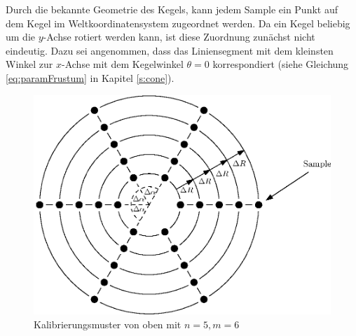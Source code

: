 Durch die bekannte Geometrie des Kegels, kann jedem Sample ein Punkt auf dem Kegel im Weltkoordinatensystem zugeordnet werden. Da ein Kegel beliebig um die $y$-Achse rotiert werden kann, ist diese Zuordnung zunächst nicht eindeutig. Dazu sei angenommen, dass das Liniensegment mit dem kleinsten Winkel zur $x$-Achse mit dem Kegelwinkel $\theta = 0$ korrespondiert (siehe Gleichung \ref{eq:paramFrustum} in Kapitel \ref{s:cone}).

\begin{figure}[!htb]
	\centering
	\includegraphics[scale=.8]{images/calibrationPatternTop.eps}
	\caption{Kalibrierungsmuster von oben mit $n = 5, m = 6$}
	\label{fig:calibrationPatternTop}
\end{figure}


